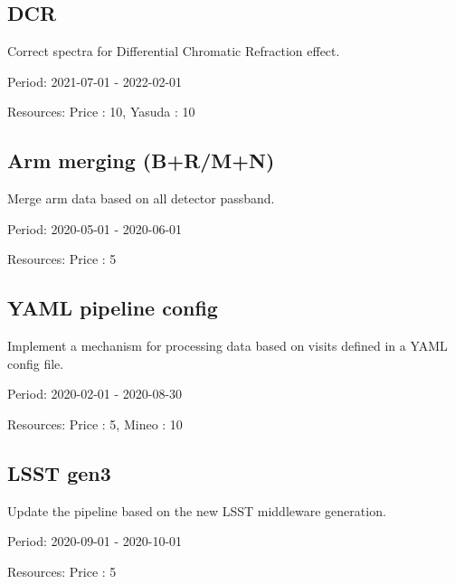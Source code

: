 \subsection{DCR}

Correct spectra for Differential Chromatic Refraction effect.

Period: 2021-07-01 - 2022-02-01

Resources: Price : 10, Yasuda : 10

\subsection{Arm merging (B+R/M+N)}

Merge arm data based on all detector passband.

Period: 2020-05-01 - 2020-06-01

Resources: Price : 5

\subsection{YAML pipeline config}

Implement a mechanism for processing data based on visits defined in a YAML config file.

Period: 2020-02-01 - 2020-08-30

Resources: Price : 5, Mineo : 10

\subsection{LSST gen3}

Update the pipeline based on the new LSST middleware generation.

Period: 2020-09-01 - 2020-10-01

Resources: Price : 5

